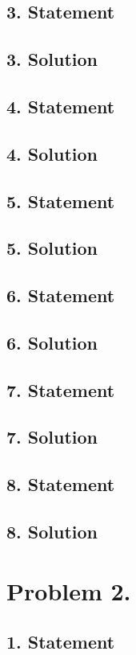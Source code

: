\subsection{3. Statement}
\subsection{3. Solution}
\subsection{4. Statement}
\subsection{4. Solution}
\subsection{5. Statement}
\subsection{5. Solution}
\subsection{6. Statement}
\subsection{6. Solution}
\subsection{7. Statement}
\subsection{7. Solution}
\subsection{8. Statement}
\subsection{8. Solution}

\section{Problem 2.}
\subsection{1. Statement}
